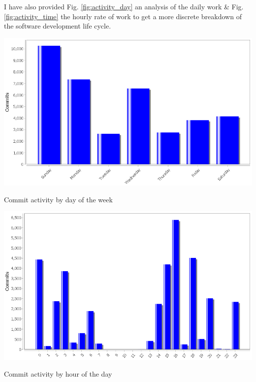 		\vspace{5mm}
		\normalsize
		{
			I have also provided Fig. \ref{fig:activity_day} an analysis of the daily work
			\& Fig. \ref{fig:activity_time} the hourly rate of work to get a more discrete breakdown of the software 
			development life cycle.
			\newline					
		}
			
		\vspace{5mm}
		\begin{figurehere}
			\centering
			\includegraphics[scale=0.7]{pages/chapter4/figures/activity_day.png}
			\caption{Commit activity by day of the week}
			\label{fig:activity_day}
		\end{figurehere}
		
		\vspace{5mm}
		\begin{figurehere}
			\centering
			\includegraphics[scale=0.7]{pages/chapter4/figures/activity_time.png}
			\caption{Commit activity by hour of the day}
			\label{fig:activity_time}
		\end{figurehere}					
			
